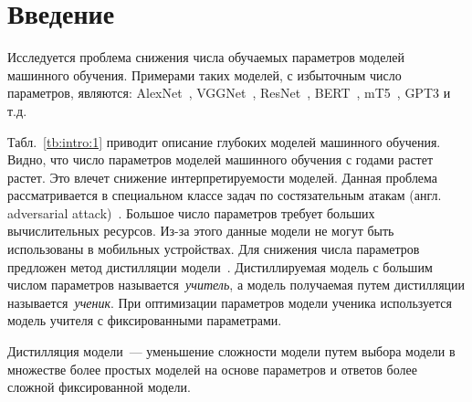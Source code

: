 \documentclass[12pt]{a&t}
\begin{document}
\section{Введение}
Исследуется проблема снижения числа обучаемых параметров моделей машинного обучения. Примерами таких моделей, с избыточным число параметров, являются: AlexNet~\cite{Krizhevsky2012}, VGGNet~\cite{Simonyan2014}, ResNet~\cite{Kaiming2015}, BERT~\cite{Devlin2018, Vaswani2017}, mT5~\cite{Linting2021}, GPT3\cite{Brown2020} и т.д.
\begin{table}[h!]
\caption{Число параметров в моделях машинного обучения.}
\label{tb:intro:1}
\begin{center}
\end{center}
\end{table}
Табл.~\ref{tb:intro:1} приводит описание глубоких моделей машинного обучения.
Видно, что число параметров моделей машинного обучения с годами растет растет.
Это влечет снижение интерпретируемости моделей.
Данная проблема рассматривается в специальном классе задач по состязательным атакам (англ. adversarial attack)~\cite{Zheng2020}.
Большое число параметров требует больших вычислительных ресурсов.
Из-за этого данные модели не могут быть использованы в мобильных устройствах.
Для снижения числа параметров предложен метод дистилляции модели~\cite{Hinton2015, Vapnik2015, Lopez2016}.
Дистиллируемая модель с большим числом параметров называется~\textit{учитель}, а модель получаемая путем дистилляции называется~\textit{ученик}.
При оптимизации параметров модели ученика используется модель учителя с фиксированными параметрами.
\begin{definition}
Дистилляция модели~--- уменьшение сложности модели путем выбора модели в множестве более простых моделей на основе параметров и ответов более сложной фиксированной модели.
\end{definition}
\end{document}
